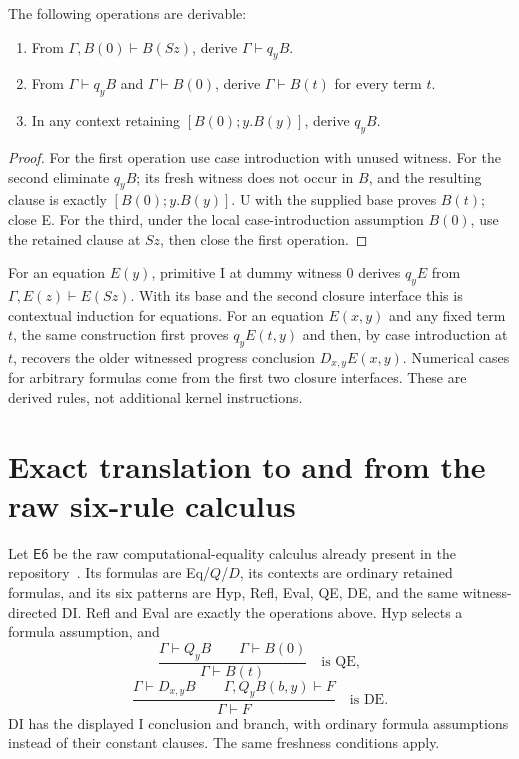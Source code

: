 \begin{lemma}
\label{lem:ce5-q}
The following operations are derivable:
\begin{enumerate}
\item From $\Gamma,B(0)\vdash B(Sz)$, derive $\Gamma\vdash q_yB$.
\item From $\Gamma\vdash q_yB$ and $\Gamma\vdash B(0)$, derive
      $\Gamma\vdash B(t)$ for every term $t$.
\item In any context retaining $[B(0);y.B(y)]$, derive $q_yB$.
\end{enumerate}
\end{lemma}
\begin{proof}
For the first operation use case introduction with unused witness.
For the second eliminate $q_yB$; its fresh witness does not occur in
$B$, and the resulting clause is exactly $[B(0);y.B(y)]$. U with the
supplied base proves $B(t)$; close E.
For the third, under the local case-introduction assumption $B(0)$,
use the retained clause at $Sz$, then close the first operation.
\end{proof}

For an equation $E(y)$, primitive I at dummy witness $0$ derives
$q_yE$ from $\Gamma,E(z)\vdash E(Sz)$. With its base and the second
closure interface this is contextual induction for equations.
For an equation $E(x,y)$ and any fixed term $t$, the same construction
first proves $q_yE(t,y)$ and then, by case introduction at $t$, recovers
the older witnessed progress conclusion $D_{x,y}E(x,y)$.
Numerical cases for arbitrary formulas come from the first two closure
interfaces. These are derived rules, not additional kernel instructions.

\section{Exact translation to and from the raw six-rule calculus}
\label{sec:ce5-equivalence}

Let $\mathsf{E6}$ be the raw computational-equality calculus already
present in the repository~\cite{computational}. Its formulas are Eq/$Q$/$D$, its contexts
are ordinary retained formulas, and its six patterns are Hyp, Refl,
Eval, QE, DE, and the same witness-directed DI. Refl and Eval are
exactly the operations above. Hyp selects a formula assumption, and
\[
 \frac{\Gamma\vdash Q_yB\qquad\Gamma\vdash B(0)}
      {\Gamma\vdash B(t)}
 \quad\text{is QE},
\]
\[
 \frac{\Gamma\vdash D_{x,y}B\qquad
       \Gamma,Q_yB(b,y)\vdash F}{\Gamma\vdash F}
 \quad\text{is DE}.
\]
DI has the displayed I conclusion and branch, with ordinary formula
assumptions instead of their constant clauses. The same freshness
conditions apply.

